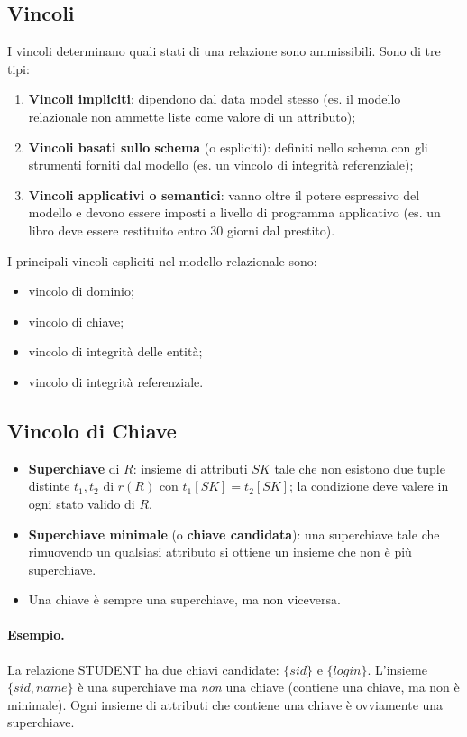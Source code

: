 \documentclass[12pt, a4paper]{article}
\begin{document}
\subsection{Vincoli}

I vincoli determinano quali stati di una relazione sono ammissibili. Sono di tre tipi:
\begin{enumerate}
    \item \textbf{Vincoli impliciti}: dipendono dal data model stesso (es. il modello relazionale non ammette liste come valore di un attributo);
    \item \textbf{Vincoli basati sullo schema} (o espliciti): definiti nello schema con gli strumenti forniti dal modello (es. un vincolo di integrità referenziale);
    \item \textbf{Vincoli applicativi o semantici}: vanno oltre il potere espressivo del modello e devono essere imposti a livello di programma applicativo (es. un libro deve essere restituito entro 30 giorni dal prestito).
\end{enumerate}

I principali vincoli espliciti nel modello relazionale sono:
\begin{itemize}
    \item vincolo di dominio;
    \item vincolo di chiave;
    \item vincolo di integrità delle entità;
    \item vincolo di integrità referenziale.
\end{itemize}

\subsection{Vincolo di Chiave}

\begin{itemize}
    \item \textbf{Superchiave} di $R$: insieme di attributi $SK$ tale che non esistono due tuple distinte $t_1, t_2$ di $r(R)$ con $t_1[SK] = t_2[SK]$; la condizione deve valere in ogni stato valido di $R$.
    \item \textbf{Superchiave minimale} (o \textbf{chiave candidata}): una superchiave tale che rimuovendo un qualsiasi attributo si ottiene un insieme che non è più superchiave.
    \item Una chiave è sempre una superchiave, ma non viceversa.
\end{itemize}

\paragraph{Esempio.} La relazione STUDENT ha due chiavi candidate: $\{sid\}$ e $\{login\}$. L'insieme $\{sid, name\}$ è una superchiave ma \emph{non} una chiave (contiene una chiave, ma non è minimale). Ogni insieme di attributi che contiene una chiave è ovviamente una superchiave.
\end{document}
